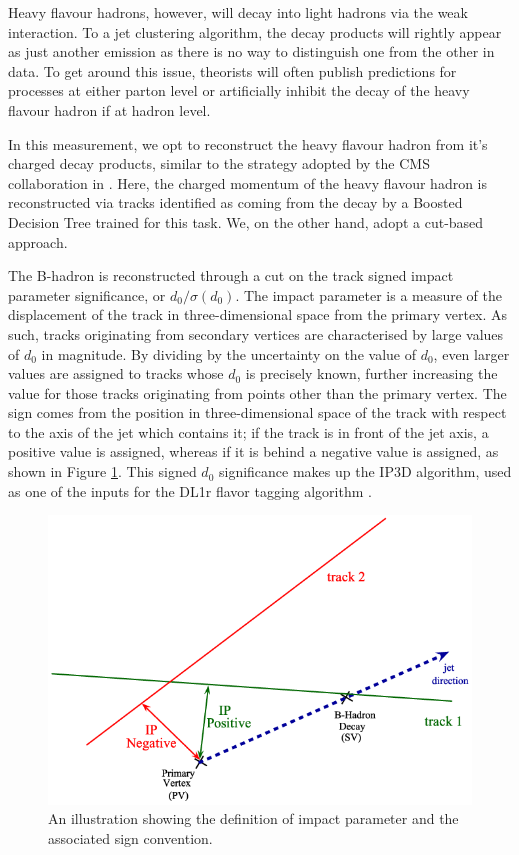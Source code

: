 \documentclass[10pt,a4paper]{book}
\begin{document}
Heavy flavour hadrons, however, will decay into light hadrons via the weak interaction. To a jet clustering algorithm, the decay products will rightly appear as just another emission as there is no way to distinguish one from the other in data. To get around this issue, theorists will often publish predictions for processes at either parton level or artificially inhibit the decay of the heavy flavour hadron if at hadron level. 

In this measurement, we opt to reconstruct the heavy flavour hadron from it's charged decay products, similar to the strategy adopted by the CMS collaboration in \cite{CMS:2024gds}. Here, the charged momentum of the heavy flavour hadron is reconstructed via tracks identified as coming from the decay by a Boosted Decision Tree trained for this task. We, on the other hand, adopt a cut-based approach. 

The B-hadron is reconstructed through a cut on the track signed impact parameter significance, or $d_0/\sigma(d_0)$. The impact parameter is a measure of the displacement of the track in three-dimensional space from the primary vertex. As such, tracks originating from secondary vertices are characterised by large values of $d_0$ in magnitude. By dividing by the uncertainty on the value of $d_0$, even larger values are assigned to tracks whose $d_0$ is precisely known, further increasing the value for those tracks originating from points other than the primary vertex. The sign comes from the position in three-dimensional space of the track with respect to the axis of the jet which contains it; if the track is in front of the jet axis, a positive value is assigned, whereas if it is behind a negative value is assigned, as shown in Figure \ref{d0sig}. This signed $d_0$ significance makes up the IP3D algorithm, used as one of the inputs for the DL1r flavor tagging algorithm \cite{ATLAS:2022qxm}.

\begin{figure}
    \centering
    \includegraphics[width=0.7\linewidth]{signedD0}
    \caption{An illustration showing the definition of impact parameter and the associated sign convention.}
    \label{d0sig}
\end{figure}
\end{document}
